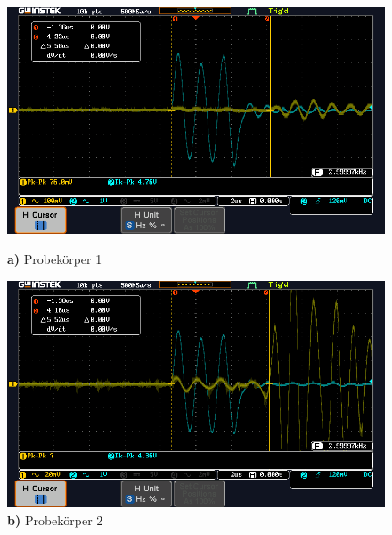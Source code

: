 \begin{figure}[h]
    \begin{minipage}[b]{.50\linewidth} %
       \includegraphics[width=\linewidth]{image/1_Quer.PNG}
       \caption*{\textbf{a)} Probekörper 1}
    \end{minipage}
    \hspace{.01\linewidth}%
    \begin{minipage}[b]{.5\linewidth} %
       \includegraphics[width=\linewidth]{image/2_quer.PNG}
       \caption*{\textbf{b)} Probekörper 2}
    \end{minipage}


\end{figure}
